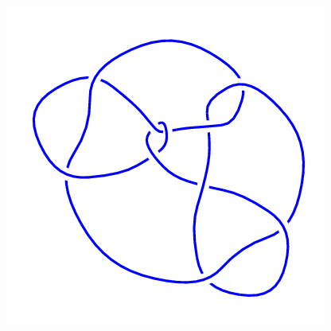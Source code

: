 \begin{figure}[H]
\begin{minipage}[b]{.18\linewidth}
	\end{minipage}
	\begin{minipage}[b]{.18\linewidth}
		\centering
		\includegraphics[width=\linewidth]{../data/10_81.png}
	\end{minipage}
\end{figure}
